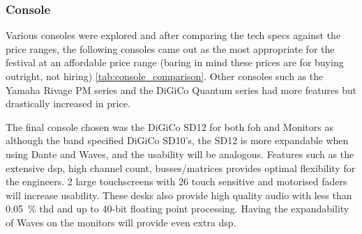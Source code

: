         \subsubsection{Console}
            Various consoles were explored and after comparing the tech specs against the price ranges, the following consoles came out as the most appropriate for the festival at an affordable price range (baring in mind these prices are for buying outright, not hiring) \ref{tab:console_comparison}. Other consoles such as the Yamaha Rivage PM series and the DiGiCo Quantum series had more features but drastically increased in price.
            
            The final console chosen was the DiGiCo SD12 for both \acrshort{foh} and Monitors as although the band specified DiGiCo SD10's, the SD12 is more expandable when using Dante and Waves, and the usability will be analogous. Features such as the extensive \acrfull{dsp}, high channel count, busses/matrices provides optimal flexibility for the engineers. 2 large touchscreens with 26 touch sensitive and motorised faders will increase usability. These desks also provide high quality audio with less than \SI{0.05}{\percent} \acrfull{thd} and up to 40-bit floating point processing. Having the expandability of Waves on the monitors will provide even extra \acrshort{dsp}.

